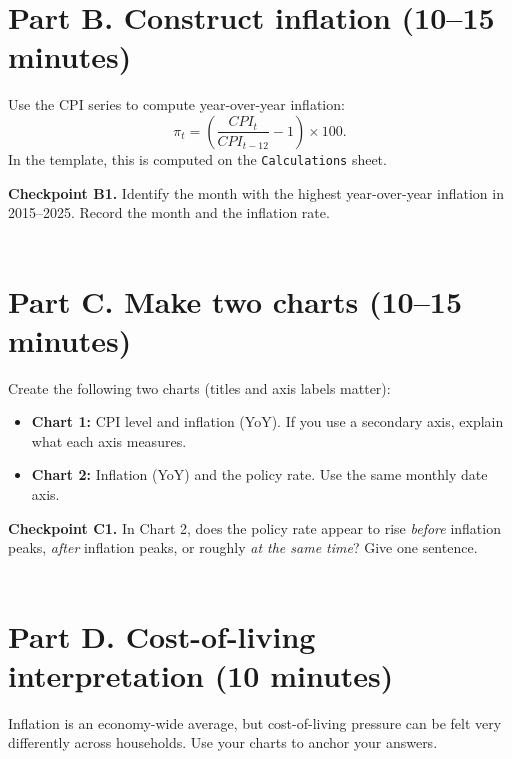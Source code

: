 \documentclass[11pt]{article}
\begin{document}
\section*{Part B. Construct inflation (10--15 minutes)}
Use the CPI series to compute year-over-year inflation:
\[
\pi_t = \left(\frac{CPI_t}{CPI_{t-12}} - 1\right)\times 100.
\]
In the template, this is computed on the \texttt{Calculations} sheet.

\vspace{0.5em}
\textbf{Checkpoint B1.} Identify the month with the highest year-over-year inflation in 2015--2025. Record the month and the inflation rate.\\[0.75em]
\underline{\hspace{0.9\linewidth}}\\[0.75em]
\underline{\hspace{0.9\linewidth}}

\section*{Part C. Make two charts (10--15 minutes)}
Create the following two charts (titles and axis labels matter):
\begin{itemize}
\item \textbf{Chart 1:} CPI level and inflation (YoY). If you use a secondary axis, explain what each axis measures.
\item \textbf{Chart 2:} Inflation (YoY) and the policy rate. Use the same monthly date axis.
\end{itemize}

\vspace{0.5em}
\textbf{Checkpoint C1.} In Chart 2, does the policy rate appear to rise \emph{before} inflation peaks, \emph{after} inflation peaks, or roughly \emph{at the same time}? Give one sentence.\\[0.75em]
\underline{\hspace{0.9\linewidth}}\\[0.75em]
\underline{\hspace{0.9\linewidth}}

\section*{Part D. Cost-of-living interpretation (10 minutes)}
Inflation is an economy-wide average, but cost-of-living pressure can be felt very differently across households. Use your charts to anchor your answers.
\end{document}
